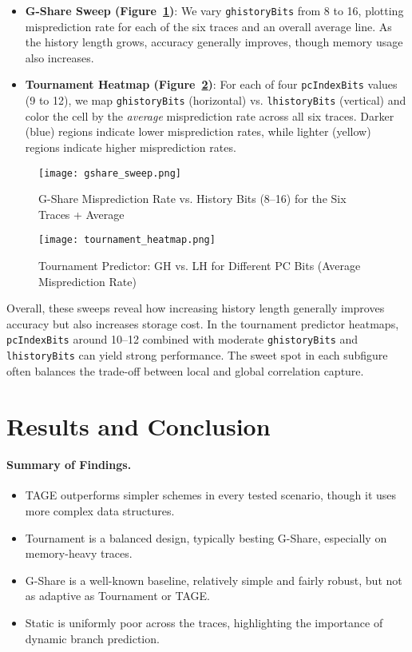 \documentclass[11pt]{article}
\begin{document}
\begin{itemize}
    \item \textbf{G-Share Sweep (Figure~\ref{fig:gshare_sweep})}: We vary \texttt{ghistoryBits} from 8 to 16, plotting misprediction rate for each of the six traces and an overall average line. As the history length grows, accuracy generally improves, though memory usage also increases.
    \item \textbf{Tournament Heatmap (Figure~\ref{fig:tourn_heatmap})}: For each of four \texttt{pcIndexBits} values (9 to 12), we map \texttt{ghistoryBits} (horizontal) vs. \texttt{lhistoryBits} (vertical) and color the cell by the \emph{average} misprediction rate across all six traces. Darker (blue) regions indicate lower misprediction rates, while lighter (yellow) regions indicate higher misprediction rates.
\end{itemize}

\begin{figure}[H]
  \centering
  \texttt{[image: gshare\_sweep.png]}
  \caption{G-Share Misprediction Rate vs. History Bits (8--16) for the Six Traces + Average}
  \label{fig:gshare_sweep}
\end{figure}

\begin{figure}[H]
  \centering
  \texttt{[image: tournament\_heatmap.png]}
  \caption{Tournament Predictor: GH vs. LH for Different PC Bits (Average Misprediction Rate)}
  \label{fig:tourn_heatmap}
\end{figure}

Overall, these sweeps reveal how increasing history length generally improves accuracy but also increases storage cost. In the tournament predictor heatmaps, \texttt{pcIndexBits} around 10--12 combined with moderate \texttt{ghistoryBits} and \texttt{lhistoryBits} can yield strong performance. The sweet spot in each subfigure often balances the trade-off between local and global correlation capture.

\section{Results and Conclusion}

\paragraph{Summary of Findings.}
\begin{itemize}
    \item TAGE outperforms simpler schemes in every tested scenario, though it uses more complex data structures.
    \item Tournament is a balanced design, typically besting G-Share, especially on memory-heavy traces.
    \item G-Share is a well-known baseline, relatively simple and fairly robust, but not as adaptive as Tournament or TAGE.
    \item Static is uniformly poor across the traces, highlighting the importance of dynamic branch prediction.
\end{itemize}
\end{document}

